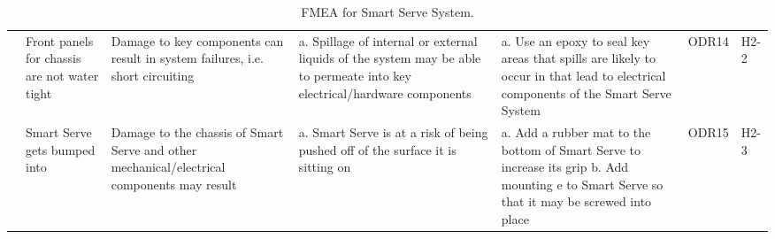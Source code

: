 \documentclass{article}
\begin{document}
\begin{rotate}{}
\begin{landscape}
\begin{table}
\begin{tabular}{|p{1.75cm}|p{4cm}|p{4cm}|p{4cm}|p{4cm}|p{1cm}|p{0.75cm}|}
            \cline{2-7}
            & Front panels for chassis are not water tight & Damage to key components can result in system failures, i.e. short circuiting & a. Spillage of internal or external liquids of the system may be able to permeate into key electrical/hardware components & a. Use an epoxy to seal key areas that spills are likely to occur in that lead to electrical components of the Smart Serve System & ODR14 & H2-2 \\ 
            \cline{2-7}
            & Smart Serve gets bumped into & Damage to the chassis of Smart Serve and other mechanical/electrical components may result & a. Smart Serve is at a risk of being pushed off of the surface it is sitting on & a. Add a rubber mat to the bottom of Smart Serve to increase its grip  b. Add mounting e to Smart Serve so that it may be screwed into place & ODR15 & H2-3 \\
            \hline
            
            \end{tabular}
            \caption{FMEA for Smart Serve System.}
            \label{tab: caption}
        \end{table}
     \end{landscape}
    \end{rotate}
\end{document}
